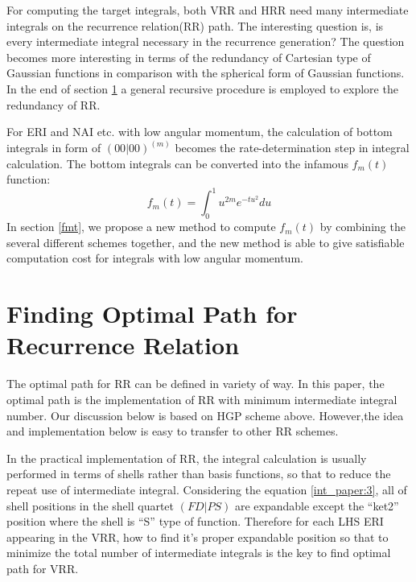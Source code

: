 For computing the target integrals, both VRR and HRR need many intermediate integrals on
the recurrence relation(RR) path. The interesting question is, is every intermediate integral 
necessary in the recurrence generation? The question becomes more interesting in terms of 
the redundancy of Cartesian type of Gaussian functions in comparison with the spherical form of 
Gaussian functions. In the end of section \ref{optimal_path} a general recursive procedure is 
employed to explore the redundancy of RR.

For ERI and NAI etc. with low angular momentum, the calculation of bottom integrals in form of 
$(00|00)^{(m)}$ becomes the rate-determination step in integral calculation. 
The bottom integrals can be converted into the infamous $f_{m}(t)$ function:
\begin{equation}\label{int_paper:6}
 f_{m}(t) = \int^{1}_{0} u^{2m} e^{-tu^{2}} du 
\end{equation}
In section \ref{fmt}, we propose a new method to compute $f_{m}(t)$ by combining the several 
different schemes together, and the new method is able to give satisfiable computation cost for 
integrals with low angular momentum.

\section{Finding Optimal Path for Recurrence Relation}
\label{optimal_path}

The optimal path for RR can be defined in variety of way. In this paper,
the optimal path is the implementation of RR with minimum intermediate integral
number. Our discussion below is based on HGP scheme above. However,the idea 
and implementation below is easy to transfer to other RR schemes.

In the practical implementation of RR, the integral calculation is usually performed 
in terms of shells rather than basis functions, so that to reduce the repeat use of 
intermediate integral. Considering the equation \ref{int_paper:3}, 
all of shell positions in the shell quartet $(FD|PS)$ are expandable except the ``ket2'' position 
where the shell is ``S'' type of 
function. Therefore for each LHS ERI appearing in the VRR, how to find it's proper expandable
position so that to minimize the total number of intermediate integrals is the key to 
find optimal path for VRR.

